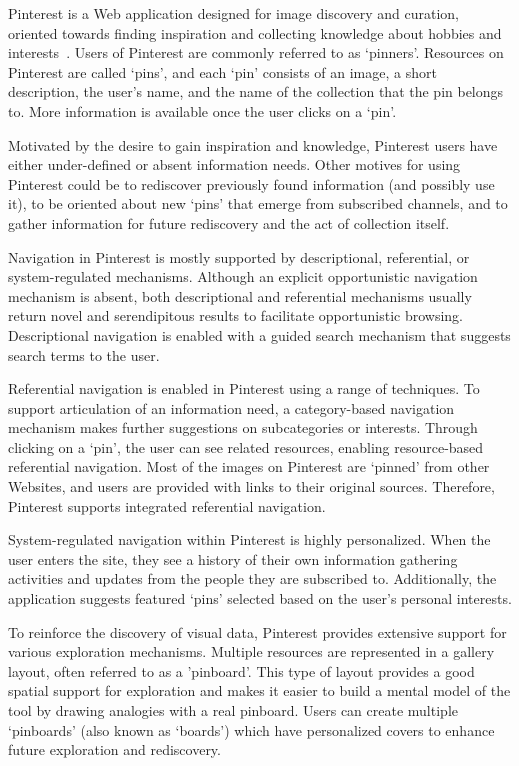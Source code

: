 \documentclass{sigchi}
\newcommand{\feature}[1]{{\ttfamily#1}}
\begin{document}
{{Pinterest is a Web application designed for image discovery and curation, oriented towards finding inspiration and collecting knowledge about hobbies and interests~\cite{gilbert2013need,zarro2012pinterest,ottoni2013ladies}.  Users of Pinterest are commonly referred to as `pinners'. Resources on Pinterest are called `pins', and each `pin' consists of an image, a short description, the user's name, and the name of the collection that the pin belongs to. More information is available once the user clicks on a `pin'.

Motivated by the desire to gain inspiration and knowledge, Pinterest users have either under-defined or absent information needs. Other motives for using Pinterest could be to rediscover previously found information (and possibly use it), to be oriented about new `pins' that emerge from subscribed channels, and to gather information for future rediscovery and the act of collection itself.

Navigation in Pinterest is mostly supported by descriptional, referential, or system-regulated mechanisms. Although an explicit \feature{opportunistic navigation mechanism} is absent, both descriptional and referential mechanisms usually return novel and serendipitous results to facilitate opportunistic browsing. Descriptional navigation is enabled with a \feature{guided search} mechanism that suggests search terms to the user. 

Referential navigation is enabled in Pinterest using a range of techniques. To support articulation of an information need, a \feature{category-based} navigation mechanism makes further suggestions on subcategories or interests. Through clicking on a `pin', the user can see related resources, enabling \feature{resource-based} referential navigation. Most of the images on Pinterest are `pinned' from other Websites, and users are provided with links to their original sources. Therefore, Pinterest supports \feature{integrated} referential navigation.

System-regulated navigation within Pinterest is highly personalized. When the user enters the site, they see a history of their own information gathering activities and updates from the people they are subscribed to. Additionally, the application suggests \feature{featured} `pins' selected based on the user's personal interests.

To reinforce the discovery of visual data, Pinterest provides extensive support for various exploration mechanisms. Multiple resources are represented in a \feature{gallery layout}, often referred to as a 'pinboard'. This type of layout provides a good spatial support for exploration and makes it easier to build a mental model of the tool by drawing analogies with a real pinboard. Users can create multiple `pinboards' (also known as `boards') which have \feature{personalized} covers to enhance future exploration and rediscovery.

}}
\end{document}
